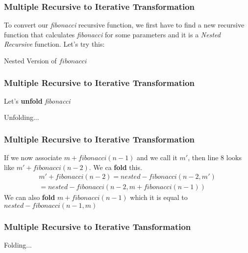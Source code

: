\documentclass{beamer}
\begin{document}
\begin{frame}
	\frametitle{Multiple Recursive to Iterative Transformation}
	To convert our \textit{fibonacci} recursive function, we first have to find a new recursive function that calculates \textit{fibonacci} for some parameters and it is a \textit{Nested Recursive} function. Let's try this:
	\begin{block}{Nested Version of $fibonacci$}
		\begin{algorithmic}[1]
				\State{}
			\EndProcedure
		\end{algorithmic}
	\end{block}
\end{frame}
\begin{frame}
	\frametitle{Multiple Recursive to Iterative Transformation}
	Let's \textbf{unfold} \textit{fibonacci}
	\begin{block}{Unfolding...}
		\begin{algorithmic}[1]
					\State{}
				\Else
						\State{}
					\Else
						\State{}
					\EndIf
				\EndIf
			\EndProcedure
		\end{algorithmic}
	\end{block}
\end{frame}
\begin{frame}
	\frametitle{Multiple Recursive to Iterative Transformation}
	If we now associate $m + fibonacci(n-1)$ and we call it $m'$, then line $8$ looks like $m' + fibonacci(n-2)$. We ca \textbf{fold} this. 
	\begin{equation}
		\begin{split}
		m' + fibonacci(n-2) = nested-fibonacci(n-2,m') \\ =
		nested-fibonacci(n-2, m + fibonacci(n-1))
		\end{split}
	\end{equation}
	We can also \textbf{fold} $m + fibonacci(n-1)$ which it is equal to $nested-fibonacci(n-1,m)$
\end{frame}
\begin{frame}
	\frametitle{Multiple Recursive to Iterative Tansformation}
	\begin{block}{Folding...}
		\begin{algorithmic}[1]
			\tiny
					\State{}
				\Else
						\State{}
					\Else
						\State{}
					\EndIf
				\EndIf
			\EndProcedure
		\end{algorithmic}
	\end{block}
\end{frame}
\end{document}
